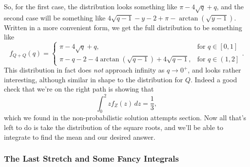So, for the first case, the distribution looks something like \( \pi - 4
\sqrt{q} + q \), and the second case will be something like \( 4 \sqrt{q - 1} -
y - 2 + \pi - \arctan{\left( \sqrt{y - 1} \right)} \).  Written in a more convenient form, we get the
full distribution to be something like
\[
    f_{Q+Q} \left( q \right) = \begin{cases}
        \pi - 4\sqrt{q} + q, & \text{for } q \in \left[ 0, 1 \right] \\
        \pi - q - 2 - 4\arctan{\left( \sqrt{q - 1} \right)} + 4\sqrt{q - 1}, & \text{for } q \in \left( 1, 2 \right]
    \end{cases}
.\]
This distribution in fact does \textit{not} approach infinity as \( q \to 0^+
\), and looks rather interesting, although similar in shape to the distribution
for \( Q \). \MarginComment{
    
}
Indeed a good check that we're on the right path is showing that
\[
    \int_{0}^{2} z f_{Z} \left( z \right) \, dz = \frac{1}{3}
,\]
which we found in the non-probabilistic solution attempts section. Now all
that's left to do is take the distribution of the square roots, and we'll be
able to integrate to find the mean and our desired answer.

\subsubsection{The Last Stretch and Some Fancy Integrals}

